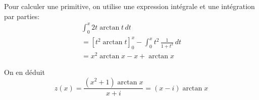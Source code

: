\begin{enumerate}
Pour calculer une primitive, on utilise une expression intégrale et une intégration par parties:
\begin{multline*}
\int_0^x 2t\arctan t\, dt \\
= \left[ t^2 \arctan t\right]_{0}^{x} - \int_0^x t^2\,\frac{1}{1+t^2}\, dt  \\
= x^2 \arctan x - x + \arctan x
\end{multline*}

On en déduit 
\begin{displaymath}
z(x) = \frac{(x^2+1)\arctan x}{x+i} = (x-i)\arctan x   
\end{displaymath}

\end{enumerate}
